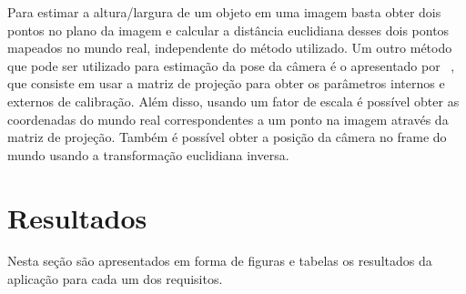 \documentclass{bmvc2k}
\begin{document}
Para estimar a altura/largura de um objeto em uma imagem basta obter dois pontos no plano da imagem e calcular a distância euclidiana desses dois pontos mapeados no mundo real, independente do método utilizado. Um outro método que pode ser utilizado para estimação da pose da câmera é o apresentado por ~\cite{teofilo}, que consiste em usar a matriz de projeção para obter os parâmetros internos e externos de calibração. Além disso, usando um fator de escala é possível obter as coordenadas do mundo real correspondentes a um ponto na imagem através da matriz de projeção. Também é possível obter a posição da câmera no frame do mundo usando a transformação euclidiana inversa.

%
%
%


\section{Resultados}
\label{sec:Results}
Nesta seção são apresentados em forma de figuras e tabelas os resultados da aplicação para cada um dos requisitos. 
\end{document}
